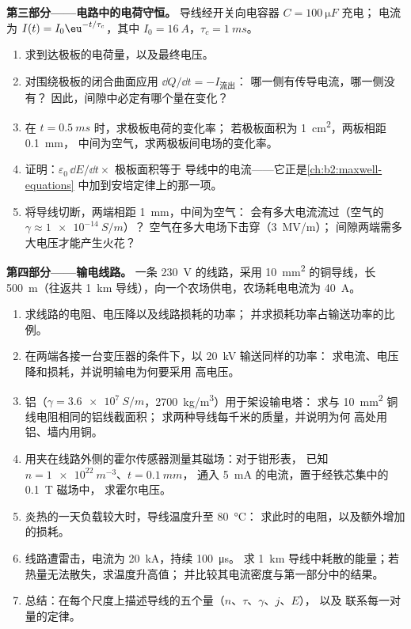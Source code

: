 \begin{problem}
\medskip
\noindent\textbf{第三部分——电路中的电荷守恒。}
导线经开关向电容器 $C = \qty{100}{\micro F}$ 充电；
电流为 $I(t) = I_0\eu^{-t/\tau_c}$，其中 $I_0 = \qty{16}{A}$，$\tau_c = \qty{1}{ms}$。
\begin{enumerate}[resume]
  \item 求到达极板的电荷量，以及最终电压。
  \item 对围绕极板的闭合曲面应用 $\dd Q/\dd t = -I_{\text{流出}}$：
        哪一侧有传导电流，哪一侧没有？
        因此，间隙中必定有哪个量在变化？
  \item 在 $t = \qty{0.5}{ms}$ 时，求极板电荷的变化率；
        若极板面积为 \qty{1}{cm^2}，两板相距 \qty{0.1}{mm}，
        中间为空气，求两极板间电场的变化率。
  \item 证明：$\varepsilon_0\,\dd E/\dd t \times$ 极板面积等于
        导线中的电流——它正是\cref{ch:b2:maxwell-equations}
        中加到安培定律上的那一项。
  \item 将导线切断，两端相距 \qty{1}{mm}，中间为空气：
        会有多大电流流过（空气的 $\gamma \approx \qty{1e-14}{S/m}$）？
        空气在多大电场下击穿（\qty{3}{MV/m}）；
        间隙两端需多大电压才能产生火花？
\end{enumerate}

\medskip
\noindent\textbf{第四部分——输电线路。}
一条 \qty{230}{V} 的线路，采用 \qty{10}{mm^2} 的铜导线，长 \qty{500}{m}（往返共
\qty{1}{km} 导线），向一个农场供电，农场耗电电流为 \qty{40}{A}。
\begin{enumerate}[resume]
  \item 求线路的电阻、电压降以及线路损耗的功率；
        并求损耗功率占输送功率的比例。
  \item 在两端各接一台变压器的条件下，以 \qty{20}{kV} 输送同样的功率：
        求电流、电压降和损耗，并说明输电为何要采用
        高电压。
  \item 铝（$\gamma = \qty{3.6e7}{S/m}$，\qty{2700}{kg/m^3}）用于架设输电塔：
        求与 \qty{10}{mm^2} 铜线电阻相同的铝线截面积；
        求两种导线每千米的质量，并说明为何
        高处用铝、墙内用铜。
  \item 用夹在线路外侧的霍尔传感器测量其磁场：对于钳形表，
        已知 $n = \qty{1e22}{m^{-3}}$、$t = \qty{0.1}{mm}$，
        通入 \qty{5}{mA} 的电流，置于经铁芯集中的 \qty{0.1}{T} 磁场中，
        求霍尔电压。
  \item 炎热的一天负载较大时，导线温度升至 \qty{80}{\degreeCelsius}：
        求此时的电阻，以及额外增加的损耗。
  \item 线路遭雷击，电流为 \qty{20}{kA}，持续 \qty{100}{\micro s}。
        求 \qty{1}{km} 导线中耗散的能量；若热量无法散失，求温度升高值；
        并比较其电流密度与第一部分中的结果。
  \item 总结：在每个尺度上描述导线的五个量（$n$、$\tau$、$\gamma$、$j$、$E$），
        以及
        联系每一对量的定律。
\end{enumerate}
\end{problem}
